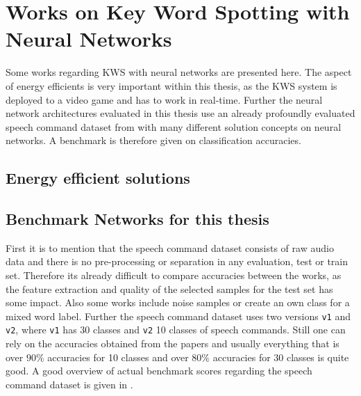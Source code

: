 
\section{Works on Key Word Spotting with Neural Networks}\label{sec:prev_kws}
Some works regarding KWS with neural networks are presented here. 
The aspect of energy efficients is very important within this thesis, as the KWS system is deployed to a video game and has to work in real-time.
Further the neural network architectures evaluated in this thesis use an already profoundly evaluated speech command dataset from \cite{Warden2018} with many different solution concepts on neural networks. 
A benchmark is therefore given on classification accuracies.

\subsection{Energy efficient solutions}


\subsection{Benchmark Networks for this thesis}\label{sec:prev_kws_benchmark}
First it is to mention that the speech command dataset \cite{Warden2018} consists of raw audio data and there is no pre-processing or separation in any evaluation, test or train set. 
Therefore its already difficult to compare accuracies between the works, as the feature extraction and quality of the selected samples for the test set has some impact.
Also some works include noise samples or create an own class for a mixed word label.
Further the speech command dataset uses two versions \texttt{v1} and \texttt{v2}, where \texttt{v1} has 30 classes and \texttt{v2} 10 classes of speech commands.
Still one can rely on the accuracies obtained from the papers and usually everything that is over $90\%$ accuracies for 10 classes and over $80\%$ accuracies for 30 classes is quite good.
A good overview of actual benchmark scores regarding the speech command dataset is given in \cite{PaperswithcodeKWS}.



